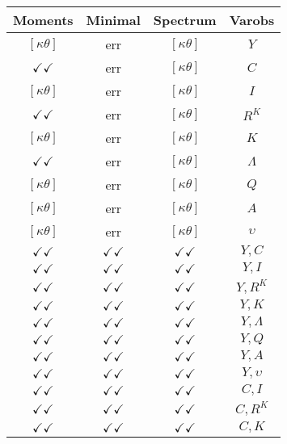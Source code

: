 \documentclass[a4paper,10pt]{article}
\begin{document}
\centering
\begin{longtable}{|c|c|c|c|}
\hline
Moments & Minimal & Spectrum & Varobs \\
\hline
$[\kappa \theta ]$ & err & $[\kappa \theta ]$ & ${Y}$ \\
\hline
$\checkmark\checkmark$ & err & $[\kappa \theta ]$ & ${C}$ \\
\hline
$[\kappa \theta ]$ & err & $[\kappa \theta ]$ & ${I}$ \\
\hline
$\checkmark\checkmark$ & err & $[\kappa \theta ]$ & ${R^{K}}$ \\
\hline
$[\kappa \theta ]$ & err & $[\kappa \theta ]$ & ${K}$ \\
\hline
$\checkmark\checkmark$ & err & $[\kappa \theta ]$ & ${\Lambda}$ \\
\hline
$[\kappa \theta ]$ & err & $[\kappa \theta ]$ & ${Q}$ \\
\hline
$[\kappa \theta ]$ & err & $[\kappa \theta ]$ & ${A}$ \\
\hline
$[\kappa \theta ]$ & err & $[\kappa \theta ]$ & ${\upsilon}$ \\
\hline
$\checkmark\checkmark$ & $\checkmark\checkmark$ & $\checkmark\checkmark$ & ${Y},{C}$ \\
\hline
$\checkmark\checkmark$ & $\checkmark\checkmark$ & $\checkmark\checkmark$ & ${Y},{I}$ \\
\hline
$\checkmark\checkmark$ & $\checkmark\checkmark$ & $\checkmark\checkmark$ & ${Y},{R^{K}}$ \\
\hline
$\checkmark\checkmark$ & $\checkmark\checkmark$ & $\checkmark\checkmark$ & ${Y},{K}$ \\
\hline
$\checkmark\checkmark$ & $\checkmark\checkmark$ & $\checkmark\checkmark$ & ${Y},{\Lambda}$ \\
\hline
$\checkmark\checkmark$ & $\checkmark\checkmark$ & $\checkmark\checkmark$ & ${Y},{Q}$ \\
\hline
$\checkmark\checkmark$ & $\checkmark\checkmark$ & $\checkmark\checkmark$ & ${Y},{A}$ \\
\hline
$\checkmark\checkmark$ & $\checkmark\checkmark$ & $\checkmark\checkmark$ & ${Y},{\upsilon}$ \\
\hline
$\checkmark\checkmark$ & $\checkmark\checkmark$ & $\checkmark\checkmark$ & ${C},{I}$ \\
\hline
$\checkmark\checkmark$ & $\checkmark\checkmark$ & $\checkmark\checkmark$ & ${C},{R^{K}}$ \\
\hline
$\checkmark\checkmark$ & $\checkmark\checkmark$ & $\checkmark\checkmark$ & ${C},{K}$ \\

\end{longtable}
\end{document}

